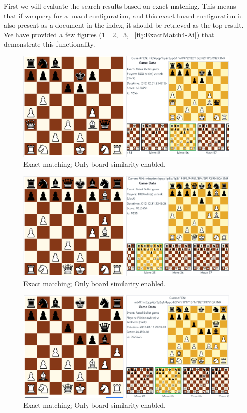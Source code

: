 \documentclass[11pt]{article}
\begin{document}
    First we will evaluate the search results based on exact matching. This means that if we query for a board configuration, and this exact board configuration is also present as a document in the index, it should be retrieved as the top result. We have provided a few figures (\ref{fig:ExactMatch1-Bo}, ~\ref{fig:ExactMatch2-Re}, ~\ref{fig:ExactMatch3-De}, ~\ref{fig:ExactMatch4-At}) that demonstrate this functionality.

    \begin{figure}[H]
        \centering
        \includegraphics[width=12cm]{images/ExactMatch1-Bo}
        \caption{Exact matching; Only board similarity enabled.}
        \label{fig:ExactMatch1-Bo}
    \end{figure}

    \begin{figure}[H]
        \centering
        \includegraphics[width=12cm]{images/ExactMatch2-Re}
        \caption{Exact matching; Only board similarity enabled.}
        \label{fig:ExactMatch2-Re}
    \end{figure}

    \begin{figure}[H]
        \centering
        \includegraphics[width=12cm]{images/ExactMatch3-De}
        \caption{Exact matching; Only board similarity enabled.}
        \label{fig:ExactMatch3-De}
    \end{figure}
\end{document}
